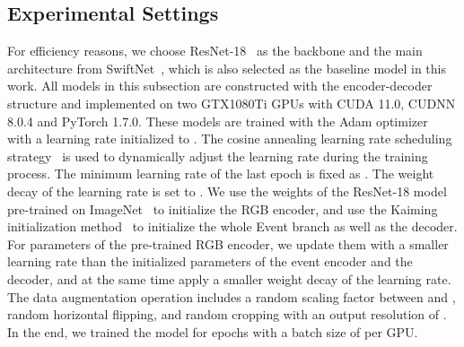 \documentclass[journal]{IEEEtran}
\begin{document}
\subsection{Experimental Settings}
For efficiency reasons, we choose ResNet-18~\cite{he2016resnet} as the backbone and the main architecture from SwiftNet~\cite{orsic2019swiftnet}, which is also selected as the baseline model in this work. All models in this subsection are constructed with the encoder-decoder structure and implemented on two GTX1080Ti GPUs with CUDA 11.0, CUDNN 8.0.4 and PyTorch 1.7.0. These models are trained with the Adam optimizer~\cite{kingma2014adam} with a learning rate initialized to . The cosine annealing learning rate scheduling strategy~\cite{Loshchilov2017SGDRSG} is used to dynamically adjust the learning rate during the training process. The minimum learning rate of the last epoch is fixed as . The weight decay of the learning rate is set to . We use the weights of the ResNet-18 model pre-trained on ImageNet~\cite{russakovsky2015imagenet} to initialize the RGB encoder, and use the Kaiming initialization method~\cite{he2015kaiming_init} to initialize the whole Event branch as well as the decoder. For parameters of the pre-trained RGB encoder, we update them with a  smaller learning rate than the initialized parameters of the event encoder and the decoder, and at the same time apply a  smaller weight decay of the learning rate. The data augmentation operation includes a random scaling factor between  and , random horizontal flipping, and random cropping with an output resolution of . In the end, we trained the model for  epochs with a batch size of  per GPU.
\end{document}

